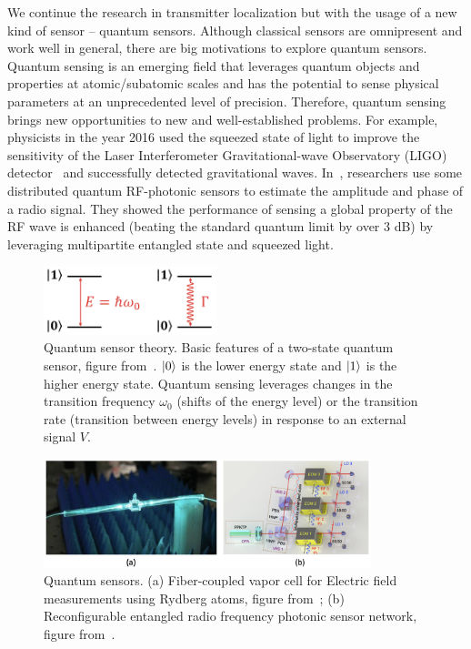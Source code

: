 We continue the research in transmitter localization but with the usage of a new kind of sensor -- quantum sensors.
Although classical sensors are omnipresent and work well in general, there are big motivations to explore quantum sensors.
Quantum sensing is an emerging field that leverages quantum objects and properties at atomic/subatomic scales and has 
the potential to sense physical parameters at an unprecedented level of precision.
Therefore, quantum sensing brings new opportunities to new and well-established problems.
For example, physicists in the year 2016 used the squeezed state of light to improve the sensitivity of the Laser Interferometer 
Gravitational-wave Observatory (LIGO) detector~\cite{ligo_2015} and successfully detected gravitational waves.
In~\cite{PRL20-qsn}, researchers use some distributed quantum RF-photonic sensors to estimate the amplitude and phase of a radio signal.
They showed the performance of sensing a global property of the RF wave is enhanced (beating the standard quantum limit by over 3 dB)
by leveraging multipartite entangled state and squeezed light.


\begin{figure}[t]
      \centering
      \includegraphics[width=0.45\textwidth]{chapters/introduction/figures/qsensor.png}
      \caption{Quantum sensor theory. Basic features of a two-state quantum sensor, figure from~\cite{RevModPhys.quantumsensing}.
               $\ket{0}$ is the lower energy state and $\ket{1}$ is the higher energy state. Quantum sensing leverages changes in the
               transition frequency $\omega_{0}$ (shifts of the energy level) or the transition rate (transition between energy levels) 
               in response to an external signal $V$.} 
      \label{fig:intro-qsensor}
\end{figure}

\begin{figure}[t]
      \centering
      \includegraphics[width=0.85\textwidth]{chapters/introduction/figures/qsensor2.png}
      \caption{Quantum sensors. (a) Fiber-coupled vapor cell for Electric field measurements using Rydberg atoms, figure from~\cite{rydberg};
               (b) Reconfigurable entangled radio frequency photonic sensor network, figure from~\cite{PRL20-qsn}.} 
      \label{fig:intro-qsensor2}
\end{figure}

